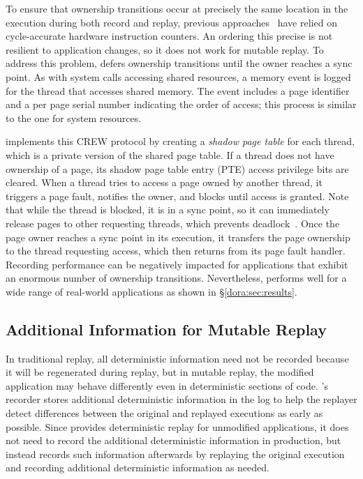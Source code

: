 To ensure that ownership transitions occur at precisely the same
location in the execution during both record and replay, previous
approaches~\cite{bressoud-tft,bressoud,revirt,smp-revirt}
have relied on cycle-accurate hardware instruction counters.  An ordering
this precise is not resilient to application changes, so it does not work for
mutable replay. To address this problem, {\dora} defers ownership
transitions until the owner reaches a sync point.  As with system
calls accessing shared resources, a memory event is logged for the
thread that accesses shared memory. The event includes a page
identifier and a per page serial number indicating the order of access; this
process is similar to the one for system resources.

{\dora} implements this CREW protocol by creating a
\emph{shadow page table} for each thread, which is a private version
of the shared page table.   If a thread does not have ownership of a
page, its shadow page table entry (PTE) access privilege bits are
cleared.  When a thread tries to access a page owned by another
thread, it triggers a page fault, notifies the owner, and blocks
until access is granted.  Note that while the thread is blocked, it
is in a sync point, so it can immediately release pages to other
requesting threads, which prevents
deadlock~\cite{scribe:sigmetrics10}.  Once the page owner reaches a
sync point in its execution, it transfers the page ownership to the
thread requesting access, which then returns from its page fault
handler.
Recording performance can be negatively impacted for applications that
exhibit an enormous number of ownership transitions.  Nevertheless,
{\dora} performs well for a wide range of 
real-world applications as shown in \S\ref{dora:sec:results}.

\subsection{Additional Information for Mutable Replay}

In traditional replay, all deterministic information need not be
recorded because it will be regenerated during replay, but in mutable
replay, the modified application may behave differently even in
deterministic sections of code.  {\dora}'s recorder stores
additional deterministic information in the log to help the replayer
detect differences between the original and replayed
executions as early as possible.  Since {\dora} provides deterministic replay for
unmodified applications, it does not need to record the additional
deterministic information in production, but instead records such
information afterwards by replaying the original
execution and recording additional deterministic information as
needed.

